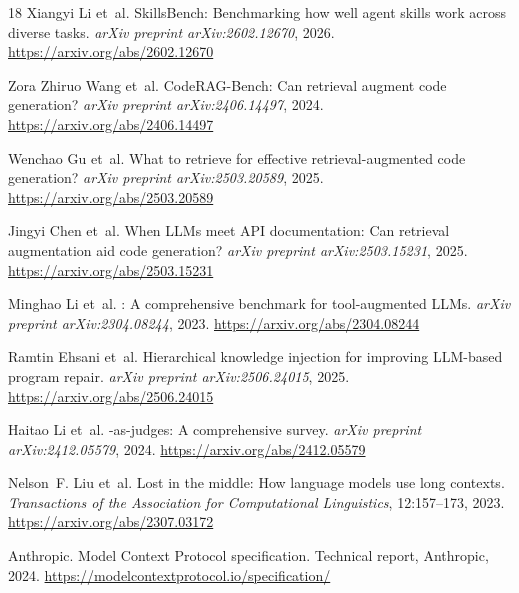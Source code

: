\documentclass[10pt,a4paper,twocolumn]{article}
\begin{document}
\begin{thebibliography}{18}
Xiangyi Li et~al.
\newblock SkillsBench: Benchmarking how well agent skills work across diverse
    tasks.
\newblock \emph{arXiv preprint arXiv:2602.12670}, 2026.
\newblock \url{https://arxiv.org/abs/2602.12670}

Zora Zhiruo Wang et~al.
\newblock CodeRAG-Bench: Can retrieval augment code generation?
\newblock \emph{arXiv preprint arXiv:2406.14497}, 2024.
\newblock \url{https://arxiv.org/abs/2406.14497}

Wenchao Gu et~al.
\newblock What to retrieve for effective retrieval-augmented code generation?
\newblock \emph{arXiv preprint arXiv:2503.20589}, 2025.
\newblock \url{https://arxiv.org/abs/2503.20589}

Jingyi Chen et~al.
\newblock When {LLMs} meet {API} documentation: Can retrieval augmentation
    aid code generation?
\newblock \emph{arXiv preprint arXiv:2503.15231}, 2025.
\newblock \url{https://arxiv.org/abs/2503.15231}

Minghao Li et~al.
: A comprehensive benchmark for tool-augmented {LLMs}.
\newblock \emph{arXiv preprint arXiv:2304.08244}, 2023.
\newblock \url{https://arxiv.org/abs/2304.08244}

Ramtin Ehsani et~al.
\newblock Hierarchical knowledge injection for improving {LLM}-based program
    repair.
\newblock \emph{arXiv preprint arXiv:2506.24015}, 2025.
\newblock \url{https://arxiv.org/abs/2506.24015}

Haitao Li et~al.
-as-judges: A comprehensive survey.
\newblock \emph{arXiv preprint arXiv:2412.05579}, 2024.
\newblock \url{https://arxiv.org/abs/2412.05579}

Nelson~F. Liu et~al.
\newblock Lost in the middle: How language models use long contexts.
\newblock \emph{Transactions of the Association for Computational Linguistics},
    12:157--173, 2023.
\newblock \url{https://arxiv.org/abs/2307.03172}

Anthropic.
\newblock Model Context Protocol specification.
\newblock Technical report, Anthropic, 2024.
\newblock \url{https://modelcontextprotocol.io/specification/}

\end{thebibliography}
\end{document}
